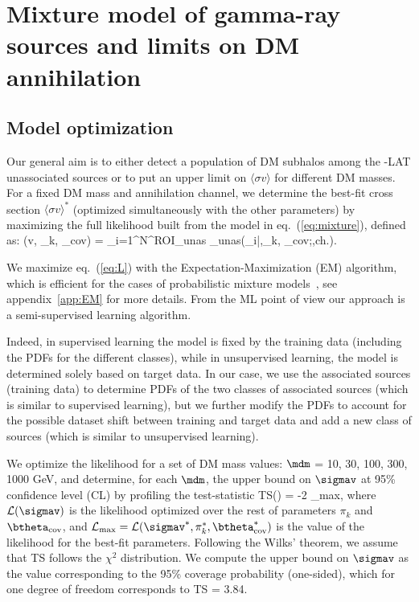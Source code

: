 \section{Mixture model of gamma-ray sources and limits on DM annihilation}
\label{sec:halos:results}

\subsection{Model optimization}
\label{sec:model-opt}

Our general aim is to either detect a population of DM subhalos among the \Fermi-LAT unassociated sources or to put an upper limit on $\langle\sigma v\rangle$ for different DM masses. For a fixed DM mass and annihilation channel, we determine the best-fit cross section $\langle\sigma v\rangle^*$ (optimized simultaneously with the other parameters) by maximizing the full likelihood built from the model in eq.~(\ref{eq:mixture}), defined as:
\be
\label{eq:L}
(\langle\sigma v\rangle, \pi_k, \btheta_\textrm{cov}) = \prod_{i=1}^{N^\textrm{ROI}_\textrm{unas}} _\textrm{unas}(\bx_i|\sigmav,\pi_k, \btheta_\textrm{cov};\mdm,\textrm{ch.}).
\ee

We maximize eq.~(\ref{eq:L}) with the Expectation-Maximization (EM) algorithm, which is efficient for the cases of probabilistic mixture models~\cite{10.1162/089976602753284446_Saerens}, see appendix~\ref{app:EM} for more details.
From the ML point of view our approach is a semi-supervised learning algorithm.

Indeed, in supervised learning the model is fixed by the training data (including the PDFs for the different classes), while in unsupervised learning, the model is determined solely based on target data.
In our case, we use the associated sources (training data) to determine PDFs of the two classes of associated sources (which is similar to supervised learning), but we further modify the PDFs to account for the possible dataset shift between training and target data and add a new class of sources (which is similar to unsupervised learning).


We optimize the likelihood for a set of DM mass values: $\mdm$ = 10, 30, 100, 300, 1000 GeV, and determine, for each $\mdm$, the upper bound on $\sigmav$ at 95\% confidence level (CL) by profiling the test-statistic 
\be
\textrm{TS}(\sigmav) = -2\ln {}
{_\textrm{max}}, 
\label{eq:halos:TS}
\ee
where $\mathcal{L}(\sigmav)$ is the likelihood optimized over the rest of parameters $\pi_k$ and $\btheta_\textrm{cov}$, and $\mathcal{L}_\textrm{max}=\mathcal{L}(\sigmav^*,\pi_k^*,\btheta_\textrm{cov}^*)$ is the value of the likelihood for the best-fit parameters. 
Following the Wilks' theorem, we assume that TS follows the $\chi^2$ distribution. 
We compute the upper bound on $\sigmav$ as the value corresponding to the 95\% coverage probability (one-sided), which for one degree of freedom corresponds to
TS = 3.84.

